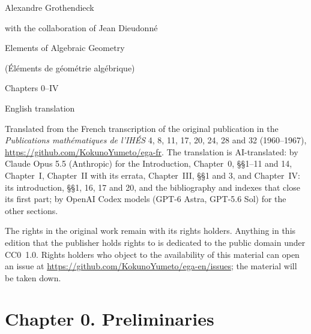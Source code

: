\documentclass[11pt]{book}
\begin{document}
\begin{titlepage}\centering
{\Large Alexandre Grothendieck}\par\smallskip
{\large with the collaboration of Jean Dieudonné}\par\vspace{2em}
{\Huge Elements of Algebraic Geometry}\par\smallskip
{\large (\'El\'ements de g\'eom\'etrie alg\'ebrique)}\par\vspace{1.5em}
{\large Chapters 0--IV}\par\vfill
{\normalsize English translation}\par
\end{titlepage}
\noindent Translated from the French transcription of the original publication in the \emph{Publications
math\'ematiques de l'IH\'ES} 4, 8, 11, 17, 20, 24, 28 and 32 (1960--1967),
\url{https://github.com/KokunoYumeto/ega-fr}. The translation is AI-translated: by Claude Opus 5.5 (Anthropic) for
the Introduction, Chapter~0, \S\S1--11 and 14, Chapter~I, Chapter~II with its errata, Chapter~III, \S\S1 and 3,
and Chapter~IV: its introduction, \S\S1, 16, 17 and 20, and the bibliography and indexes that close its first part;
by OpenAI Codex models (GPT-6 Astra, GPT-5.6 Sol) for the other sections.

The rights in the original work remain with its rights holders. Anything in this edition that the publisher holds
rights to is dedicated to the public domain under CC0~1.0. Rights holders who object to the availability of this
material can open an issue at \url{https://github.com/KokunoYumeto/ega-en/issues}; the material will be taken down.
\clearpage
\tableofcontents
\cleardoublepage{}

\chapter*{Chapter 0. Preliminaries}
\setcounter{section}{0}

\setcounter{section}{1}

\setcounter{section}{2}

\setcounter{section}{3}

\setcounter{section}{4}

\setcounter{section}{5}

\setcounter{section}{6}

\setcounter{section}{7}

\setcounter{section}{8}

\setcounter{section}{9}

\setcounter{section}{10}

\setcounter{section}{11}

\setcounter{section}{12}

\setcounter{section}{13}

\setcounter{section}{14}

\setcounter{section}{15}

\setcounter{section}{16}

\setcounter{section}{17}

\setcounter{section}{18}

\setcounter{section}{19}

\setcounter{section}{20}

\setcounter{section}{21}

\setcounter{section}{22}

\end{document}
